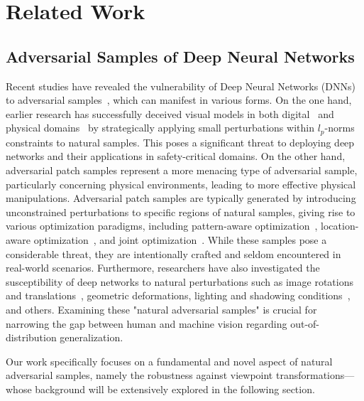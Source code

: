 \documentclass[10pt,journal,compsoc]{IEEEtran}
\begin{document}
\section{Related Work}
\label{sec:2}
\subsection{Adversarial Samples of Deep Neural Networks}
\label{sec:asdnn}

Recent studies have revealed the vulnerability of Deep Neural Networks (DNNs) to adversarial samples~\cite{goodfellow2014explaining, szegedy2013intriguing}, which can manifest in various forms. On the one hand, earlier research has successfully deceived visual models in both digital~\cite{wei2021black,liang2021parallel,wei2022sparse} and physical domains~\cite{wei2022physically,wei2023physically} by strategically applying small perturbations within $l_p$-norms constraints to natural samples. This poses a significant threat to deploying deep networks and their applications in safety-critical domains. On the other hand, adversarial patch samples represent a more menacing type of adversarial sample, particularly concerning physical environments, leading to more effective physical manipulations. Adversarial patch samples are typically generated by introducing unconstrained perturbations to specific regions of natural samples, giving rise to various optimization paradigms, including pattern-aware optimization~\cite{karmon2018lavan, brown2017adversarial}, location-aware optimization~\cite{wei2022adversarial},  and joint optimization~\cite{wei2022simultaneously}. While these samples pose a considerable threat, they are intentionally crafted and seldom encountered in real-world scenarios. Furthermore, researchers have also investigated the susceptibility of deep networks to natural perturbations such as image rotations and translations~\cite{engstrom2019exploring}, geometric deformations\cite{kanbak2018geometric, alfarra2022deformrs}, lighting and shadowing conditions~\cite{zhong2022shadows,li2023physical}, and others. Examining these "natural adversarial samples" is crucial for narrowing the gap between human and machine vision regarding out-of-distribution generalization.

Our work specifically focuses on a fundamental and novel aspect of natural adversarial samples, namely the robustness against viewpoint transformations—whose background will be extensively explored in the following section.
\end{document}
